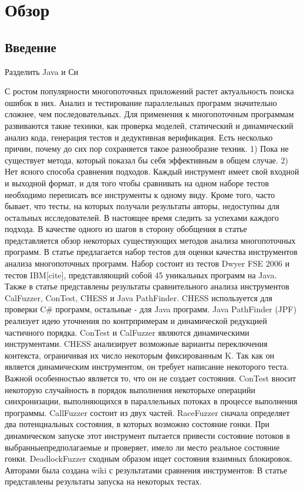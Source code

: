 \chapter{Обзор}
\label{chapter_related_work}

\section{Введение}
\label{rw:introduction}

Разделить Java и Си

С ростом популярности многопоточных приложений растет актуальность поиска ошибок в них. Анализ и тестирование параллельных программ значительно сложнее, чем последовательных. Для применения к многопоточным программам развиваются такие техники, как проверка моделей, статический и динамический анализ кода, генерация тестов и дедуктивная верификация. Есть несколько причин, почему до сих пор сохраняется такое разнообразие техник.
1) Пока не существует метода, который показал бы себя эффективным в общем случае. 
2) Нет ясного способа сравнения подходов. Каждый инструмент имеет свой входной и выходной формат, и для того чтобы сравнивать на одном наборе тестов необходимо переписать все инструменты к одному виду. Кроме того, часто бывает, что тесты, на которых получали результаты авторы, недоступны для остальных исследователей.
В настоящее время следить за успехами каждого подхода. В качестве одного из шагов в сторону обобщения в статье~\cite{Rungta:2009} представляется обзор некоторых существующих методов анализа многопоточных программ.
В статье предлагается набор тестов для оценки качества инструментов анализа многопоточных программ. Набор состоит из тестов Dwyer FSE 2006 и тестов IBM[cite], представляющий собой 45 уникальных программ на Java. Также в статье представлены результаты сравнительного анализа инструментов CalFuzzer, ConTest, CHESS и Java PathFinder. CHESS используется для проверки C\# программ, остальные - для Java программ. Java PathFinder (JPF) реализует идею уточнения по контрпримерам и динамической редукцией частичного порядка. ConTest и CalFuzzer являются динамическими инструментами. 
CHESS анализирует возможные варианты переключения контекста, ограничивая их число некоторым фиксированным K. Так как он является динамическим инструментом, он требует написание некоторого теста. Важной особенностью является то, что он не создает состояния.
ConTest вносит некоторую случайность в порядок выполнения некоторыхе операцийи синхронизации, выполняющихся в параллельных потоках в процессе выполнения программы.
CallFuzzer состоит из двух частей. RaceFuzzer сначала определяет два потенциальных состояния, в которых возможно состояние гонки. При динамическом запуске этот инструмент пытается привести состояние потоков в выбранныепредполагаемые и проверяет, имело ли место реальное состояние гонки. DeadlockFuzzer сходным образом ищет состояния взаимных блокировок.
Авторами была создана wiki с результатами сравнения инструментов: 
В статье представлены результаты запуска на некоторых тестах.

